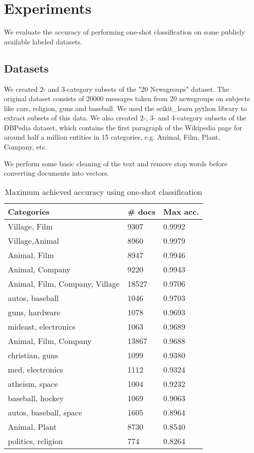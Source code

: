 \section{Experiments}
We evaluate the accuracy of performing one-shot classification on some publicly available labeled datasets.

\subsection{Datasets}
We created 2- and 3-category subsets of the "20 Newsgroups" dataset. The original dataset consists of 20000 messages taken from 20 newsgroups on subjects like cars, religion, guns and baseball. We used the scikit\_learn python library to extract subsets of this data. We also created 2-, 3- and 4-category subsets of the DBPedia dataset, which contains the first paragraph of the Wikipedia page for around half a million entities in 15 categories, e.g. Animal, Film, Plant, Company, etc.

We perform some basic cleaning of the text and remove stop words before converting documents into vectors.

\begin{table}[]
\centering
\captionsetup{position=bottom}
\begin{tabular}{lll}
\toprule
Categories                  & \# docs & Max acc. \\
\midrule
Village, Film                & 9307         & 0.9992       \\
Village,Animal              & 8960         & 0.9979       \\
Animal, Film                 & 8947         & 0.9946       \\
Animal, Company              & 9220         & 0.9943       \\
Animal, Film, Company, Village & 18527        & 0.9706       \\
autos, baseball              & 1046         & 0.9703       \\
guns, hardware               & 1078         & 0.9693       \\
mideast, electronics         & 1063         & 0.9689       \\
Animal, Film, Company         & 13867        & 0.9688       \\
christian, guns              & 1099         & 0.9380       \\
med, electronics             & 1112         & 0.9324       \\
atheism, space               & 1004         & 0.9232       \\
baseball, hockey             & 1069         & 0.9063       \\
autos, baseball, space        & 1605         & 0.8964       \\
Animal, Plant                & 8730         & 0.8540       \\
politics, religion           & 774          & 0.8264      \\
\bottomrule
\end{tabular}
\caption{Maximum achieved accuracy using one-shot classification}\label{bruteforce}
\end{table}

